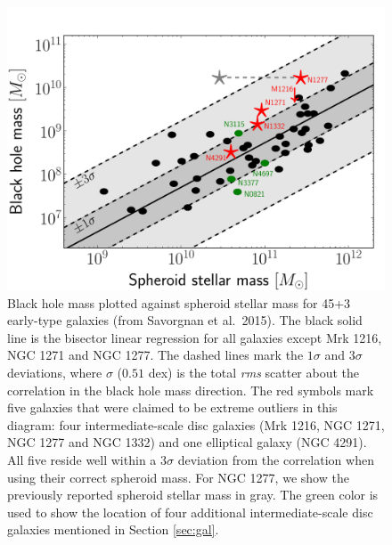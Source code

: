 \documentclass[useAMS,usenatbib,article]{mnras}
\begin{document}
\begin{figure}
\begin{center}
\includegraphics[width=\columnwidth]{mm.pdf}
\caption{Black hole mass plotted against spheroid stellar mass for 45+3 early-type galaxies (from Savorgnan et al.~2015). 
The black solid line is the bisector linear regression for all galaxies except Mrk 1216, NGC 1271 and NGC 1277. 
The dashed lines mark the $1\sigma$ and $3\sigma$ deviations, 
where $\sigma$ ($0.51$ dex) is the total \emph{rms} scatter about the correlation in the black hole mass direction. 
The red symbols mark five galaxies that were claimed to be extreme outliers in this diagram: 
four intermediate-scale disc galaxies (Mrk 1216, NGC 1271, NGC 1277 and NGC 1332) and one elliptical galaxy (NGC 4291). 
All five reside well within a $3\sigma$ deviation from the correlation when using their correct spheroid mass. 
For NGC 1277, we show the previously reported spheroid stellar mass \citep{vandenbosch2012} in gray. 
The green color is used to show the location of four additional intermediate-scale disc galaxies mentioned in Section \ref{sec:gal}.}
\label{fig:mm}
\end{center}
\end{figure}
\end{document}
